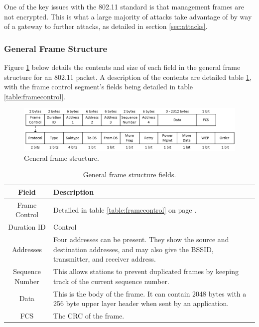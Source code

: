 One of the key issues with the 802.11 standard is that management frames are not encrypted. This is what a large majority of attacks take advantage of by way of a gateway to further attacks, as detailed in section \ref{sec:attacks}.

\clearpage
\subsubsection{General Frame Structure}
Figure \ref{fig:framestructure} below details the contents and size of each field in the general frame structure for an 802.11 packet. A description of the contents are detailed table \ref{table:framefields}, with the frame control segment's fields being detailed in table \ref{table:framecontrol}.

\begin{figure}[h!]
\centering\includegraphics[width=\linewidth]{research/80211/figures/framestructure.png}
\caption{General frame structure.}
\label{fig:framestructure}
\end{figure}

	\begin{table}[!h]
\begin{center}
	\begin{tabular}{| c |  p{5cm} |}
		\hline
		\textbf{Field} & \textbf{Description} \\ \hline
		Frame Control & Detailed in table \ref{table:framecontrol} on page \pageref{table:framecontrol}.\\ \hline
		Duration ID & Control \\ \hline
		Addresses & Four addresses can be present.  They show the source and destination addresses, and may also give the BSSID, transmitter, and receiver address.  \\ \hline
		Sequence Number & This allows stations to prevent duplicated frames by keeping track of the current sequence number. \\ \hline
		Data & This is the body of the frame. It can contain 2048 bytes with a 256 byte upper layer header when sent by an application. \\ \hline
		FCS & The CRC \cite{research:crc_wiki} of the frame. \\ \hline
	\end{tabular}
	\caption{General frame structure fields.}
	\label{table:framefields}
\end{center}
	\end{table}

